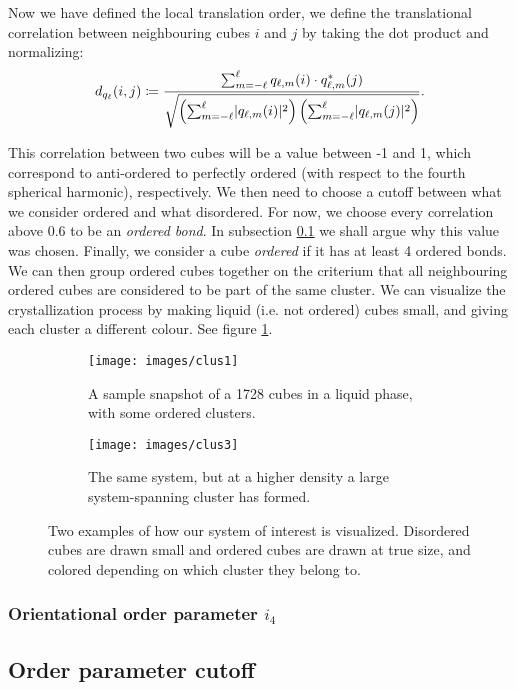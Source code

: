 \documentclass[thesis]{subfiles}
\begin{document}
Now we have defined the local translation order, we define the translational correlation between neighbouring cubes $i$ and $j$ by taking the dot product and normalizing:
\begin{equation}
	d_{q_\ell}(i, j) \coloneqq \frac{\sum_{m = -\ell}^\ell q_{\ell, m}(i) \cdot q^*_{\ell, m}(j)}{\sqrt{\left(\sum_{m = -\ell}^\ell \lvert q_{\ell, m}(i)\rvert^2\right) \left(\sum_{m = -\ell}^\ell \lvert q_{\ell, m}(j)\rvert^2\right)}}.
\end{equation}

This correlation between two cubes will be a value between -1 and 1, which correspond to anti-ordered to perfectly ordered (with respect to the fourth spherical harmonic), respectively. We then need to choose a cutoff between what we consider ordered and what disordered. For now, we choose every correlation above 0.6 to be an \emph{ordered bond}. In subsection \ref{subsec:order param cutoff} we shall argue why this value was chosen.
Finally, we consider a cube \emph{ordered} if it has at least 4 ordered bonds. We can then group ordered cubes together on the criterium that all neighbouring ordered cubes are considered to be part of the same cluster. We can visualize the crystallization process by making liquid (i.e. not ordered) cubes small, and giving each cluster a different colour. See figure \ref{fig:sample_snapshot}.

\begin{figure}
	\centering
	\begin{subfigure}{0.48\textwidth}
		\centering
		\texttt{[image: images/clus1]}
		\caption{A sample snapshot of a 1728 cubes in a liquid phase, with some ordered clusters.}
	\end{subfigure}\hfill
	\begin{subfigure}{0.48\textwidth}
		\centering
		\texttt{[image: images/clus3]}
		\caption{The same system, but at a higher density a large system-spanning cluster has formed.}
	\end{subfigure}
	\caption{Two examples of how our system of interest is visualized. Disordered cubes are drawn small and ordered cubes are drawn at true size, and colored depending on which cluster they belong to.}
	\label{fig:sample_snapshot}
\end{figure}

\subsubsection{Orientational order parameter \texorpdfstring{$i_4$}{i4}}

\subsection{Order parameter cutoff} \label{subsec:order param cutoff}


\vspace{50pt}

\printbibliography[%
]

\end{document}
